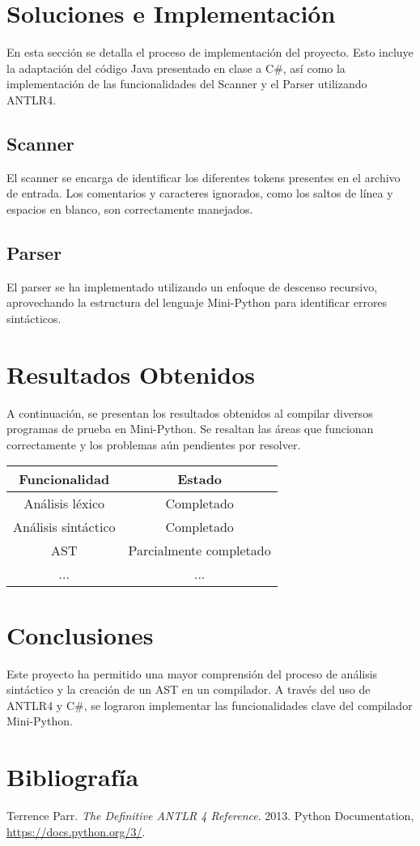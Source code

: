 \documentclass{article}
\begin{document}
\section{Soluciones e Implementación}
En esta sección se detalla el proceso de implementación del proyecto. Esto incluye la adaptación del código Java presentado en clase a C\#, así como la implementación de las funcionalidades del Scanner y el Parser utilizando ANTLR4.

\subsection{Scanner}
El scanner se encarga de identificar los diferentes tokens presentes en el archivo de entrada. Los comentarios y caracteres ignorados, como los saltos de línea y espacios en blanco, son correctamente manejados.

\subsection{Parser}
El parser se ha implementado utilizando un enfoque de descenso recursivo, aprovechando la estructura del lenguaje Mini-Python para identificar errores sintácticos.

\section{Resultados Obtenidos}
A continuación, se presentan los resultados obtenidos al compilar diversos programas de prueba en Mini-Python. Se resaltan las áreas que funcionan correctamente y los problemas aún pendientes por resolver.

\begin{center}
    \begin{tabular}{|c|c|}
        \hline
        Funcionalidad & Estado \\
        \hline
        Análisis léxico & Completado \\
        Análisis sintáctico & Completado \\
        AST & Parcialmente completado \\
        ... & ... \\
        \hline
    \end{tabular}
\end{center}

\section{Conclusiones}
Este proyecto ha permitido una mayor comprensión del proceso de análisis sintáctico y la creación de un AST en un compilador. A través del uso de ANTLR4 y C\#, se lograron implementar las funcionalidades clave del compilador Mini-Python.

\section{Bibliografía}
\begin{thebibliography}{9}
     Terrence Parr. \textit{The Definitive ANTLR 4 Reference}. 2013.
     Python Documentation, \url{https://docs.python.org/3/}.
\end{thebibliography}
\end{document}
